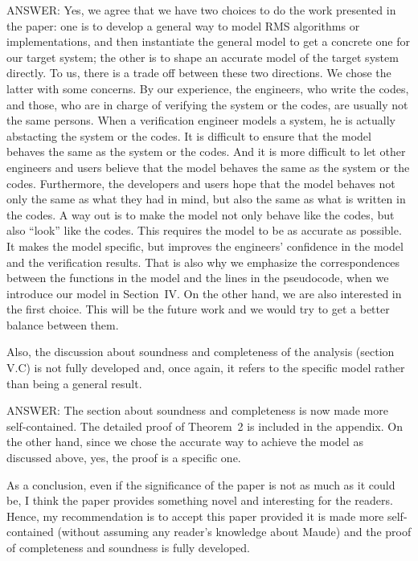 \documentclass[10pt,journal]{IEEEtran}
\begin{document}
ANSWER: Yes, we agree that we have two choices to do the work
presented in the paper: one is to develop a general way to model RMS
algorithms or implementations, and then instantiate the general model
to get a concrete one for our target system; the other is to shape an
accurate model of the target system directly. To us, there is a trade
off between these two directions. We chose the latter with some
concerns. By our experience, the engineers, who write the codes, and
those, who are in charge of verifying the system or the codes, are
usually not the same persons. When a verification engineer models a
system, he is actually abstacting the system or the codes. It is
difficult to ensure that the model behaves the same as the system or
the codes.  And it is more difficult to let other engineers and users
believe that the model behaves the same as the system or the
codes. Furthermore, the developers and users hope that the model
behaves not only the same as what they had in mind, but also the same
as what is written in the codes. A way out is to make the model not
only behave like the codes, but also ``look'' like the codes. This
requires the model to be as accurate as possible. It makes the model
specific, but improves the engineers' confidence in the model and the
verification results. That is also why we emphasize the
correspondences between the functions in the model and the lines in
the pseudocode, when we introduce our model in Section~IV. On the
other hand, we are also interested in the first choice. This will be
the future work and we would try to get a better balance between them.

Also, the discussion about soundness and
completeness of the analysis (section V.C) is not fully developed and,
once again, it refers to the specific model rather than being a
general result.

ANSWER: The section about soundness and completeness is now made more
self-contained. The detailed proof of Theorem~2 is included in the
appendix. On the other hand, since we chose the accurate way to
achieve the model as discussed above, yes, the proof is a specific
one.

As a conclusion, even if the significance of the paper is not as much
as it could be, I think the paper provides something novel and
interesting for the readers. Hence, my recommendation is to accept
this paper provided it is made more self-contained (without assuming
any reader's knowledge about Maude) and the proof of completeness and
soundness is fully developed.
\end{document}
